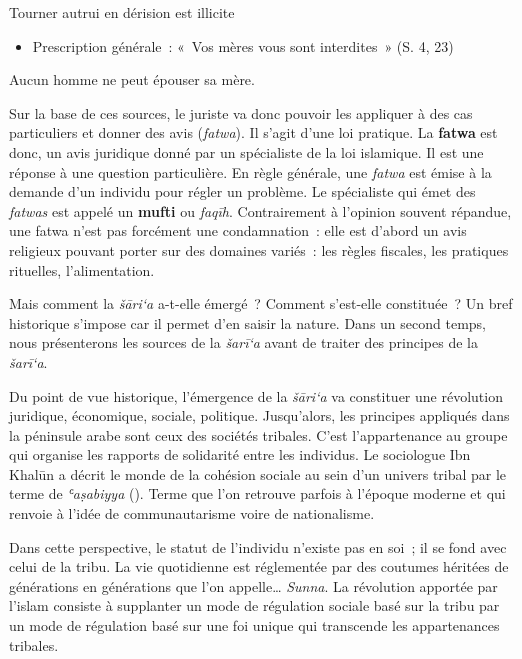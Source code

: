 Tourner autrui en dérision est illicite

\begin{itemize}
\item
  Prescription générale~: «~Vos mères vous sont interdites~» (S. 4, 23)
\end{itemize}

Aucun homme ne peut épouser sa mère.

Sur la base de ces sources, le juriste va donc pouvoir les appliquer à
des cas particuliers et donner des avis (\emph{fatwa}). Il s'agit d'une
loi pratique. La \textbf{fatwa} est donc, un avis juridique donné par un
spécialiste de la loi islamique. Il est une réponse à une question
particulière. En règle générale, une \emph{fatwa} est émise à la demande
d'un individu pour régler un problème. Le spécialiste qui émet des
\emph{fatwas} est appelé un \textbf{mufti} ou \emph{faqīh}.
Contrairement à l'opinion souvent répandue, une fatwa n'est pas
forcément une condamnation~: elle est d'abord un avis religieux pouvant
porter sur des domaines variés~: les règles fiscales, les pratiques
rituelles, l'alimentation.

Mais comment la \emph{šāri`a} a-t-elle émergé~? Comment s'est-elle
constituée~? Un bref historique s'impose car il permet d'en saisir la
nature. Dans un second temps, nous présenterons les sources de la
\emph{šarī`a} avant de traiter des principes de la \emph{šarī`a}.


Du point de vue historique, l'émergence de la \emph{šāri`a} va
constituer une révolution juridique, économique, sociale, politique.
Jusqu'alors, les principes appliqués dans la péninsule arabe sont ceux
des sociétés tribales. C'est l'appartenance au groupe qui organise les
rapports de solidarité entre les individus. Le sociologue Ibn Khalūn a
décrit le monde de la cohésion sociale au sein d'un univers tribal par
le terme de \emph{ʿaṣabiyya} (). Terme que l'on retrouve
parfois à l'époque moderne et qui renvoie à l'idée de communautarisme
voire de nationalisme.

Dans cette perspective, le statut de l'individu n'existe pas en soi~; il
se fond avec celui de la tribu. La vie quotidienne est réglementée par
des coutumes héritées de générations en générations que l'on
appelle\ldots{} \emph{Sunna}. La révolution apportée par l'islam
consiste à supplanter un mode de régulation sociale basé sur la tribu
par un mode de régulation basé sur une foi unique qui transcende les
appartenances tribales.

